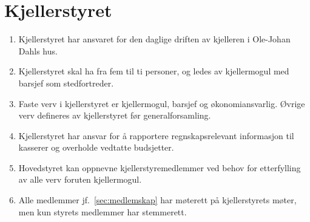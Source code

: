 \documentclass[8pt,norsk,a4paper]{article}
\begin{document}
\section{Kjellerstyret}
\begin{enumerate}
	\item{Kjellerstyret har ansvaret for den daglige driften av kjelleren i Ole-Johan Dahls hus.}
	\item{Kjellerstyret skal ha fra fem til ti personer, og ledes av kjellermogul med barsjef som stedfortreder.}
	\item{Faste verv i kjellerstyret er kjellermogul, barsjef og økonomiansvarlig. Øvrige verv defineres av kjellerstyret før generalforsamling.}
	\item{Kjellerstyret har ansvar for å rapportere regnskapsrelevant informasjon til kasserer og overholde vedtatte budsjetter.}
	\item{Hovedstyret kan oppnevne kjellerstyremedlemmer ved behov for etterfylling av alle verv foruten kjellermogul.}
 	\item{Alle medlemmer jf.~\ref{sec:medlemskap} har møterett på kjellerstyrets møter, men kun styrets medlemmer har stemmerett.}
\end{enumerate}
\end{document}

